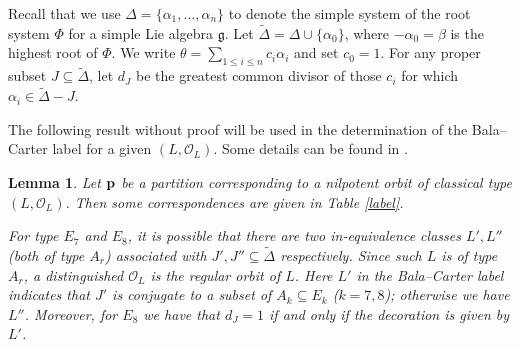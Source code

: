 \documentclass[reqno,12pt]{amsart}
\numberwithin{equation}{section}
\theoremstyle{plain}
\newtheorem{Lem}[Thm]{Lemma}
\theoremstyle{definition}
\renewcommand{\subset}{\subseteq}
\renewcommand{\leq}{\leqslant}
\begin{document}



Recall that we use $\Delta=\{\alpha_1,\dots,\alpha_n\} $ to denote the simple system of the root system $\Phi$ for a simple Lie algebra $\mathfrak{g}$. Let $\tilde{\Delta}=\Delta\cup \{\alpha_0\}$, where  $-\alpha_0=\beta$ is the highest root of $\Phi$. We write $\theta=\sum_{1\leq i\leq n}c_i\alpha_i$ and set $c_0=1$. For any proper subset $J\subset \tilde{\Delta}$, let $d_J$ be the greatest common divisor of those $c_i$ for which $\alpha_i\in \tilde{\Delta}-J$.




The following result without proof will be used in the determination of the Bala--Carter label for a given $(L,\mathcal{O}_L)$. Some details can be found in \cite{Ca85, som-98}.

\begin{Lem}\label{prime1-2}
Let ${\bf p} $ be a partition corresponding to a nilpotent orbit of classical type $(L,\mathcal{O}_L)$. Then some correspondences are given in   Table \ref{label}.


For type $E_7$ and $E_8$, it is possible that there are two in-equivalence classes $L', L''$ (both of type $A_r$) associated with $J', J'' \subseteq \tilde{\Delta}$ respectively. Since such $L$ is of type $A_r$, a distinguished $\mathcal{O}_L$ is the regular orbit of $L$. Here $L'$ in 
the Bala--Carter label indicates that $J'$ is conjugate to a subset of $A_k\subset E_k$ ($k=7,8$); otherwise  we have $L''$. Moreover, for $E_8$ we have that $d_J=1$ if and only if the decoration is given by $L'$.

    
\end{Lem}
\end{document}
